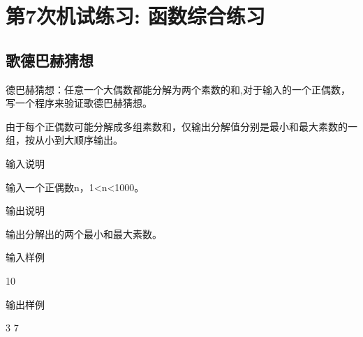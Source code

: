 %
%
%
\chapter{第7次机试练习: 函数综合练习}

\section{歌德巴赫猜想}
德巴赫猜想：任意一个大偶数都能分解为两个素数的和,对于输入的一个正偶数，写一个程序来验证歌德巴赫猜想。

由于每个正偶数可能分解成多组素数和，仅输出分解值分别是最小和最大素数的一组，按从小到大顺序输出。

输入说明	

输入一个正偶数n，1<n<1000。

输出说明
	
输出分解出的两个最小和最大素数。

输入样例
	
10

输出样例
	
3 7

